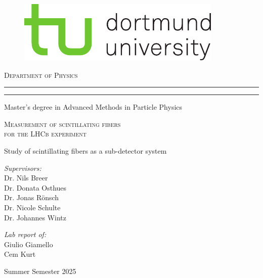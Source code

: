 \begin{titlepage}
	
	\begin{figure}[ht]
		\vspace{-0.5cm} %
		\begin{center}
			\includegraphics[scale=1.50]{tud_logos/logo_tud_english.pdf}
		\end{center}
	\end{figure}

    \vspace{15mm} %
	
	\begin{center}
		{{\large{\textsc{Department of Physics}}}}
		\rule[0.1cm]{\linewidth}{0.3mm} %
		\rule[0.5cm]{\linewidth}{0.3mm} %
		Master’s degree in Advanced Methods in Particle Physics
	\end{center}
	
	\vspace{25mm} %
	\begin{center}
		\begin{Large}
			\textsc{Measurement of scintillating fibers\\ for the LHCb
            experiment}
		\end{Large}
        
        \vspace{5mm} %
        Study of scintillating fibers as a sub-detector system
	\end{center}
	
	\vspace{35mm} %
	\noindent
	\begin{minipage}[t]{0.47\textwidth}
		{\large{\textit{Supervisors:}
        \\ Dr. Nils Breer
        \\ Dr. Donata Osthues
        \\ Dr. Jonas Rönsch
        \\ Dr. Nicole Schulte
        \\ Dr. Johannes Wintz}}
	\end{minipage}
	\hfill
	\begin{minipage}[t]{0.47\textwidth}\raggedleft
		{\large{\textit{Lab report of:}
        \\ Giulio Giamello
        \\Cem Kurt}}
	\end{minipage}
	\vfill
	\vspace{15mm}
	\begin{center}
		{\large{Summer Semester 2025}}
	\end{center}
	\vspace{-2cm}
	
\end{titlepage}

